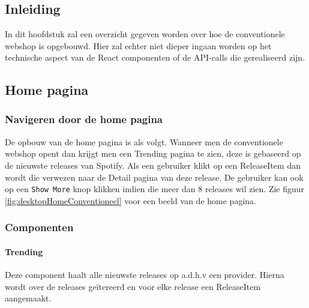 
\chapter{}%
\label{ch:proofofconceptConventioneel}

\section{Inleiding}

In dit hoofdstuk zal een overzicht gegeven worden over hoe de conventionele webshop is opgebouwd. Hier zal echter niet dieper ingaan worden op het technische aspect van de React componenten of de API-calls die gerealiseerd zijn.

\section{Home pagina}

\subsection{Navigeren door de home pagina}
De opbouw van de home pagina is als volgt. Wanneer men de conventionele webshop opent dan krijgt men een Trending pagina te zien, deze is gebaseerd op de nieuwste releases van Spotify. Als een gebruiker klikt op een ReleaseItem dan wordt die verwezen naar de Detail pagina van deze release. De gebruiker kan ook op een \texttt{Show More} knop klikken indien die meer dan 8 releases wil zien. Zie figuur \ref{fig:desktopHomeConventioneel} voor een beeld van de home pagina.

\subsection{Componenten}

\subsubsection{Trending}

Deze component haalt alle nieuwste releases op a.d.h.v een provider. Hierna wordt over de releases geïtereerd en voor elke release een ReleaseItem aangemaakt.

